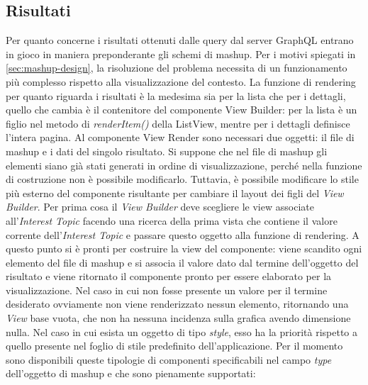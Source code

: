 \subsection{Risultati}\label{sec:view-risultati}
Per quanto concerne i risultati ottenuti dalle query dal server GraphQL entrano in gioco in maniera preponderante gli schemi di mashup. Per i motivi spiegati in \ref{sec:mashup-design}, la risoluzione del problema necessita di un funzionamento più complesso rispetto alla visualizzazione del contesto. La funzione di rendering per quanto riguarda i risultati è la medesima sia per la lista che per i dettagli, quello che cambia è il contenitore del componente View Builder: per la lista è un figlio nel metodo di \emph{renderItem()} della ListView, mentre per i dettagli definisce l'intera pagina.
	Al componente View Render sono necessari due oggetti: il file di mashup e i dati del singolo risultato.
	Si suppone che nel file di mashup gli elementi siano già stati generati in ordine di visualizzazione, perché nella funzione di costruzione non è possibile modificarlo. Tuttavia, è possibile modificare lo stile più esterno del componente risultante per cambiare il layout dei figli del \emph{View Builder}. Per prima cosa il \emph{View Builder} deve scegliere le view associate all'\emph{Interest Topic} facendo una ricerca della prima vista che contiene il valore corrente dell'\emph{Interest Topic} e passare questo oggetto alla funzione di rendering. A questo punto si è pronti per costruire la view del componente: viene scandito ogni elemento del file di mashup e si associa il valore dato dal termine dell'oggetto del risultato e viene ritornato il componente pronto per essere elaborato per la visualizzazione. Nel caso in cui non fosse presente un valore per il termine desiderato ovviamente non viene renderizzato nessun elemento, ritornando una \emph{View} base vuota, che non ha nessuna incidenza sulla grafica avendo dimensione nulla. Nel caso in cui esista un oggetto di tipo \emph{style}, esso ha la priorità rispetto a quello presente nel foglio di stile predefinito dell'applicazione. Per il momento sono disponibili queste tipologie di componenti specificabili nel campo \emph{type} dell'oggetto di mashup e che sono pienamente supportati:
